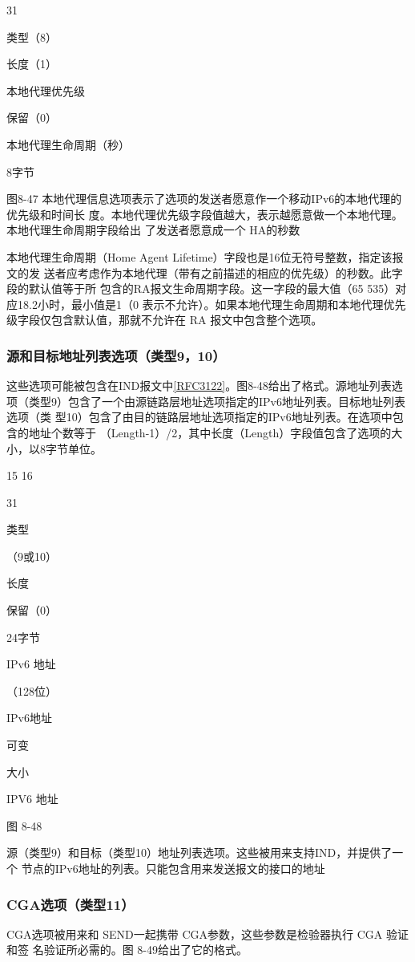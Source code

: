31

类型（8）

长度（1）

本地代理优先级

保留（0）

本地代理生命周期（秒）

8字节

图8-47 本地代理信息选项表示了选项的发送者愿意作一个移动IPv6的本地代理的优先级和时间长
度。本地代理优先级字段值越大，表示越愿意做一个本地代理。本地代理生命周期字段给出
了发送者愿意成一个 HA的秒数

本地代理生命周期（Home Agent Lifetime）字段也是16位无符号整数，指定该报文的发
送者应考虑作为本地代理（带有之前描述的相应的优先级）的秒数。此字段的默认值等于所
包含的RA报文生命周期字段。这一字段的最大值（65 535）对应18.2小时，最小值是1（0
表示不允许）。如果本地代理生命周期和本地代理优先级字段仅包含默认值，那就不允许在
RA 报文中包含整个选项。

\subsubsection{源和目标地址列表选项（类型9，10）}
这些选项可能被包含在IND报文中\href{https://www.rfc-editor.org/rfc/rfc3122}{[RFC3122]}。图8-48给出了格式。源地址列表选
项（类型9）包含了一个由源链路层地址选项指定的IPv6地址列表。目标地址列表选项（类
型10）包含了由目的链路层地址选项指定的IPv6地址列表。在选项中包含的地址个数等于
（Length-1）/2，其中长度（Length）字段值包含了选项的大小，以8字节单位。

15 16

31

类型

（9或10）

长度

保留（0）

24字节

IPv6 地址

（128位）

IPv6地址

可变

大小

IPV6 地址

图 8-48

源（类型9）和目标（类型10）地址列表选项。这些被用来支持IND，并提供了一个
节点的IPv6地址的列表。只能包含用来发送报文的接口的地址

\subsubsection{CGA选项（类型11）}
CGA选项被用来和 SEND一起携带 CGA参数，这些参数是检验器执行 CGA 验证和签
名验证所必需的。图 8-49给出了它的格式。


